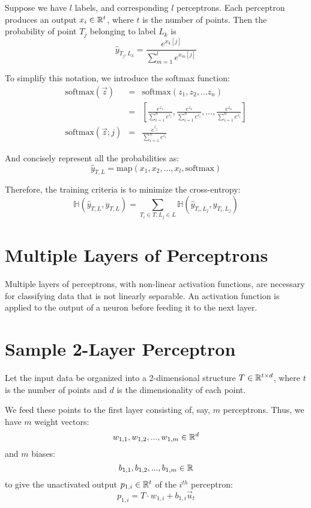 \documentclass{article}
\begin{document}
  Suppose we have $l$ labels, and corresponding $l$ perceptrons.
  Each perceptron produces an output $x_i \in \mathbb{R}^t$,
  where $t$ is the number of points.
  Then the probability of point $T_j$ 
  belonging to label $L_k$
  is
  \[ \hat y_{T_j, L_k} = 
        \frac{e^{x_k[j]}}
             {\sum_{m = 1}^{l} e^{x_m[j]} }
  \]
  
  To simplify this notation, we introduce the softmax function:
  \begin{eqnarray*}
    \text{softmax}(\overrightarrow z)
      & = & \text{softmax}(z_1, z_2, ... z_n)
    \\
      & = & \left[ \frac{e^{z_1}}{\sum_{i=1}^n e^{z_i}},
                   \frac{e^{z_2}}{\sum_{i=1}^n e^{z_i}},
                   ...,
                   \frac{e^{z_n}}{\sum_{i=1}^n e^{z_i}}
            \right]
    \\
    \text{softmax}(\overrightarrow z; j)
      & = & \frac{e^{z_j}}{\sum_{i=1}^n e^{z_i}}
  \end{eqnarray*}
  
  And concisely represent
  all the probabilities as:
  \[\hat y_{T, L} = \text{map}(x_1, x_2, ..., x_l, \text{softmax})\]
  
  Therefore, the training criteria is to minimize the cross-entropy:
  \[ \mathbb{H}(\hat y_{T, L}, y_{T, L})
       = \sum_{T_i \in T, L_j \in L} \mathbb{H}(\hat y_{T_i, L_j},
                                                y_{T_i, L_j})
  \]
  
\section{Multiple Layers of Perceptrons}
  Multiple layers of perceptrons,
  with non-linear activation functions, are necessary
  for classifying data that is not linearly separable.
  An activation function is applied to the output of a neuron
  before feeding it to the next layer.
  
\section{Sample 2-Layer Perceptron}
  Let the input data be organized
  into a 2-dimensional structure
  $T \in \mathbb{R}^{t \times d}$,
  where $t$ is the number of points
  and $d$ is the dimensionality of each point.
  
  We feed these points to the first layer
  consisting of, say, $m$ perceptrons.
  Thus, we have $m$ weight vectors:
  \[ w_{1, 1}, w_{1, 2}, ..., w_{1, m} \in \mathbb{R}^d \]
  and $m$ biases:
  \[ b_{1, 1}, b_{1, 2}, ..., b_{1, m} \in \mathbb{R} \]
  to give the unactivated output 
  $p_{1, i} \in \mathbb{R}^{t}$ 
  of the $i^{th}$ perceptron:
  \[ p_{1, i} = T \cdot w_{1, i} + b_{1, i}\overrightarrow u_{t} \]
  
\end{document}
